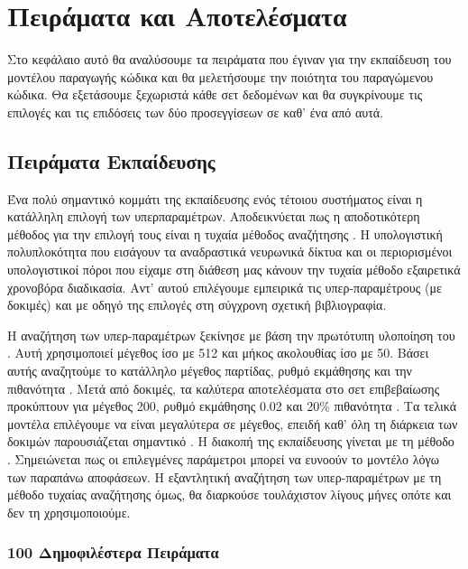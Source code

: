 \chapter{Πειράματα και Αποτελέσματα}

Στο κεφάλαιο αυτό θα αναλύσουμε τα πειράματα που έγιναν για την εκπαίδευση του μοντέλου παραγωγής κώδικα και θα μελετήσουμε την ποιότητα του παραγώμενου κώδικα.
Θα εξετάσουμε ξεχωριστά κάθε σετ δεδομένων και θα συγκρίνουμε τις επιλογές και τις επιδόσεις των δύο προσεγγίσεων σε καθ' ένα από αυτά.

\section{Πειράματα Eκπαίδευσης}

Ένα πολύ σημαντικό κομμάτι της εκπαίδευσης ενός τέτοιου συστήματος είναι η κατάλληλη επιλογή των υπερπαραμέτρων.
Αποδεικνύεται πως η αποδοτικότερη μέθοδος για την επιλογή τους είναι η τυχαία μέθοδος αναζήτησης \cite{Bergstra2012}.
Η υπολογιστική πολυπλοκότητα που εισάγουν τα αναδραστικά νευρωνικά δίκτυα και οι περιορισμένοι υπολογιστικοί πόροι που είχαμε στη διάθεση μας κάνουν την τυχαία μέθοδο εξαιρετικά χρονοβόρα διαδικασία.
Αντ' αυτού επιλέγουμε εμπειρικά τις υπερ-παραμέτρους (με δοκιμές) και με οδηγό της επιλογές στη σύγχρονη σχετική βιβλιογραφία.

Η αναζήτηση των υπερ-παραμέτρων ξεκίνησε με βάση την πρωτότυπη υλοποίηση του .
Αυτή χρησιμοποιεί μέγεθος  ίσο με 512 και μήκος ακολουθίας ίσο με 50. Βάσει αυτής αναζητούμε το κατάλληλο μέγεθος παρτίδας, ρυθμό εκμάθησης και την πιθανότητα .
Μετά από δοκιμές, τα καλύτερα αποτελέσματα στο σετ επιβεβαίωσης προκύπτουν για μέγεθος  200, ρυθμό εκμάθησης 0.02 και 20\% πιθανότητα .
Τα τελικά μοντέλα επιλέγουμε να είναι μεγαλύτερα σε μέγεθος, επειδή καθ' όλη τη διάρκεια των δοκιμών παρουσιάζεται σημαντικό .
Η διακοπή της εκπαίδευσης γίνεται με τη μέθοδο .
Σημειώνεται πως οι επιλεγμένες παράμετροι μπορεί να ευνοούν το μοντέλο  λόγω των παραπάνω αποφάσεων.
Η εξαντλητική αναζήτηση των υπερ-παραμέτρων με τη μέθοδο τυχαίας αναζήτησης όμως, θα διαρκούσε τουλάχιστον λίγους μήνες οπότε και δεν τη χρησιμοποιούμε.

\subsection{100 Δημοφιλέστερα  Πειράματα}

